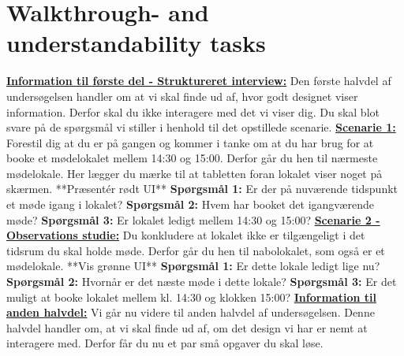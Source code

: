 \section{Walkthrough- and understandability tasks}\label{appendix:usability_tasks}
\underline{\textbf{Information til første del - Struktureret interview:}}
Den første halvdel af undersøgelsen handler om at vi skal finde ud af, hvor godt designet viser information. Derfor skal du ikke interagere med det vi viser dig. Du skal blot svare på de spørgsmål vi stiller i henhold til det opstillede scenarie.
\newline\newline
\underline{\textbf{Scenarie 1:}}
Forestil dig at du er på gangen og kommer i tanke om at du har brug for at booke et mødelokalet mellem 14:30 og 15:00.
Derfor går du hen til nærmeste mødelokale. Her lægger du mærke til at tabletten foran lokalet viser noget på skærmen.
\newline\newline
**Præsentér rødt UI**
\newline\newline
\textbf{Spørgsmål 1:}
Er der på nuværende tidspunkt et møde igang i lokalet?
\newline
\textbf{Spørgsmål 2:}
Hvem har booket det igangværende møde?
\newline
\textbf{Spørgsmål 3:}
Er lokalet ledigt mellem 14:30 og 15:00?
\newline\newline
\underline{\textbf{Scenarie 2 - Observations studie:}}
Du konkludere at lokalet ikke er tilgængeligt i det tidsrum du skal holde møde. Derfor går du hen til nabolokalet, som også er et mødelokale.  
\newline\newline
**Vis grønne UI**
\newline\newline
\textbf{Spørgsmål 1:}
Er dette lokale ledigt lige nu?
\newline
\textbf{Spørgsmål 2:}
Hvornår er det næste møde i dette lokale?
\newline
\textbf{Spørgsmål 3:}
Er det muligt at booke lokalet mellem kl. 14:30 og klokken 15:00?
\newline\newline
\underline{\textbf{Information til anden halvdel:}}
Vi går nu videre til anden halvdel af undersøgelsen. Denne halvdel handler om, at vi skal finde ud af, om det design vi har er nemt at interagere med. Derfor får du nu et par små opgaver du skal løse. 
